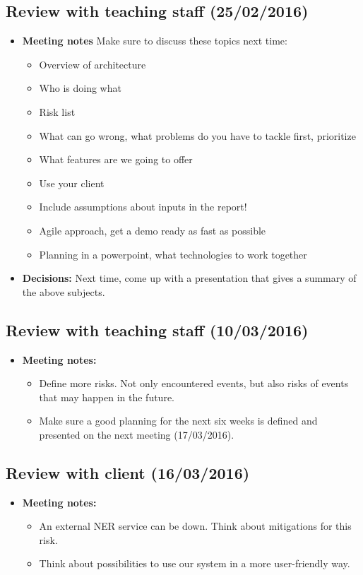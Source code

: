 \documentclass[a4paper,12pt]{article}
\begin{document}
\subsection{Review with teaching staff (25/02/2016)}
\begin{itemize}
\item \textbf{Meeting notes} 
Make sure to discuss these topics next time:
\begin{itemize}
\item Overview of architecture
\item Who is doing what
\item Risk list
\item What can go wrong, what problems do you have to tackle first, prioritize
\item What features are we going to offer
\item Use your client
\item Include assumptions about inputs in the report!
\item Agile approach, get a demo ready as fast as possible
\item Planning in a powerpoint, what technologies to work together 
\end{itemize}
\item \textbf{Decisions:} Next time, come up with a presentation that gives a summary of the above subjects.
\end{itemize}
\subsection{Review with teaching staff (10/03/2016)}
\begin{itemize}
\item \textbf{Meeting notes:}
\begin{itemize}
\item Define more risks. Not only encountered events, but also risks of events that may happen in the future.
\item Make sure a good planning for the next six weeks is defined and presented on the next meeting (17/03/2016).
\end{itemize}
\end{itemize}


\subsection{Review with client (16/03/2016)}
\begin{itemize}
\item \textbf{Meeting notes:} 
\begin{itemize}
\item An external NER service can be down. Think about mitigations for this risk.
\item Think about possibilities to use our system in a more user-friendly way.
\end{itemize}
\end{itemize}
\end{document}

